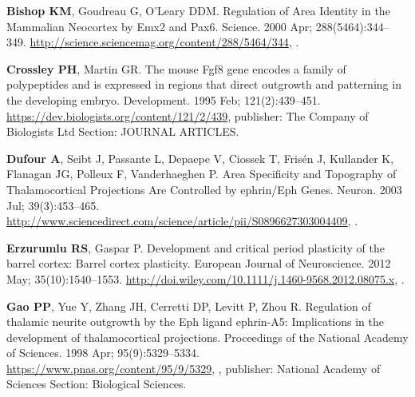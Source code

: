 \documentclass[9pt,lineno]{elife}
\begin{document}
\begin{thebibliography}{31}
\textbf{\color{eLifeMediumGrey} Bishop KM}, Goudreau G, O'Leary DDM.
\newblock Regulation of {Area} {Identity} in the {Mammalian} {Neocortex} by
  {Emx2} and {Pax6}.
\newblock Science.  2000 Apr; 288(5464):344--349.
\newblock \urlprefix\url{http://science.sciencemag.org/content/288/5464/344},
  \href{10.1126/science.288.5464.344}{\doiprefix
  }.

\textbf{\color{eLifeMediumGrey} Crossley PH}, Martin GR.
\newblock The mouse {Fgf8} gene encodes a family of polypeptides and is
  expressed in regions that direct outgrowth and patterning in the developing
  embryo.
\newblock Development.  1995 Feb; 121(2):439--451.
\newblock \urlprefix\url{https://dev.biologists.org/content/121/2/439},
  publisher: The Company of Biologists Ltd Section: JOURNAL ARTICLES.

\textbf{\color{eLifeMediumGrey} Dufour A}, Seibt J, Passante L, Depaepe V,
  Ciossek T, Fris\'en J, Kullander K, Flanagan JG, Polleux F, Vanderhaeghen P.
\newblock Area {Specificity} and {Topography} of {Thalamocortical}
  {Projections} {Are} {Controlled} by ephrin/{Eph} {Genes}.
\newblock Neuron.  2003 Jul; 39(3):453--465.
\newblock
  \urlprefix\url{http://www.sciencedirect.com/science/article/pii/S0896627303004409},
  \href{10.1016/S0896-6273(03)00440-9}{\doiprefix
  }.

\textbf{\color{eLifeMediumGrey} Erzurumlu RS}, Gaspar P.
\newblock Development and critical period plasticity of the barrel cortex:
  {Barrel} cortex plasticity.
\newblock European Journal of Neuroscience.  2012 May; 35(10):1540--1553.
\newblock
  \urlprefix\url{http://doi.wiley.com/10.1111/j.1460-9568.2012.08075.x},
  \href{10.1111/j.1460-9568.2012.08075.x}{\doiprefix
  }.

\textbf{\color{eLifeMediumGrey} Gao PP}, Yue Y, Zhang JH, Cerretti DP, Levitt
  P, Zhou R.
\newblock Regulation of thalamic neurite outgrowth by the {Eph} ligand
  ephrin-{A5}: {Implications} in the development of thalamocortical
  projections.
\newblock Proceedings of the National Academy of Sciences.  1998 Apr;
  95(9):5329--5334.
\newblock \urlprefix\url{https://www.pnas.org/content/95/9/5329},
  \href{10.1073/pnas.95.9.5329}{\doiprefix
  }, publisher: National Academy of Sciences
  Section: Biological Sciences.


\end{thebibliography}
\end{document}
